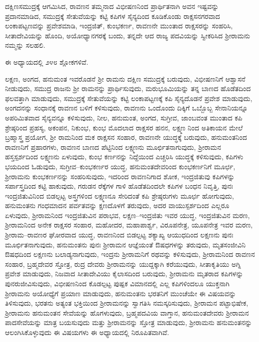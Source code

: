 ದಕ್ಷಿಣಸಮುದ್ರಕ್ಕೆ ಆಗಮಿಸಿದ, ರಾವಣನ ತಮ್ಮನಾದ ವಿಭೀಷಣನಿಂದ ಪ್ರಾರ್ಥಿತನಾಗಿ ಅವನ ಇಷ್ಟವನ್ನು ಪ್ರದಾನಮಾಡಿದ, ಸಮುದ್ರಕ್ಕೆ ಸೇತುವೆಯನ್ನು ಕಟ್ಟಿ ಕಪಿಗಳ ಸೈನ್ಯದಿಂದ ಕೂಡಿಕೊಂಡು ರಾಕ್ಷಸನಗರವಾದ ಲಂಕಾಪಟ್ಟಣವನ್ನು ಪ್ರವೇಶಮಾಡಿ, ಇಂದ್ರಜಿತ್, ಕುಂಭಕರ್ಣ, ರಾವಣನೇ ಮುಂತಾದ ರಾಕ್ಷಸರನ್ನು ಸಂಹರಿಸಿ, ಸೀತಾದೇವಿಯನ್ನು ಹೊಂದಿ, ಅಯೋಧ್ಯಾನಗರಕ್ಕೆ ಬಂದು, ತನ್ನದೇ ಆದ ರಾಜ್ಯ ಪದವಿಯನ್ನು ಸ್ವೀಕರಿಸಿದ ಶ‍್ರೀರಾಮನು ನಮ್ಮನ್ನು ಸಲಹಲಿ.

ಈ ಅಧ್ಯಾಯದಲ್ಲಿ ೨೪೮ ಶ್ಲೋಕಗಳಿವೆ.

ಲಕ್ಷಣ, ಅಂಗದ, ಹನುಮಂತ ಇವರೊಡನೆ ಶ‍್ರೀ ರಾಮನು ದಕ್ಷಿಣ ಸಮುದ್ರಕ್ಕೆ ಬರುವುದು, ವಿಭೀಷಣನಿಗೆ ಆಶ್ವಾಸನೆ ನೀಡುವುದು, ಸಮುದ್ರ ರಾಜನು ಶ‍್ರೀ ರಾಮನನ್ನು ಪ್ರಾರ್ಥಿಸುವುದು, ಮರುಭೂಮಿಯನ್ನು ತನ್ನ ಬಾಣದ ಹೊಡೆತದಿಂದ ಫಲವತ್ತಾಗಿ ಮಾಡುವುದು, ಸಮುದ್ರಕ್ಕೆ ಸೇತುವೆಯನ್ನು ಕಟ್ಟಿ ಲಂಕಾಪಟ್ಟಣಕ್ಕೆ ಕಪಿ ಸೈನ್ಯದೊಡನೆ ಪ್ರವೇಶ ಮಾಡುವುದು, ಅಂಗದನನ್ನು ಸಂಧಾನಕ್ಕೆ ರಾವಣನ ಬಳಿಗೆ ಕಳಿಸುವುದು, ರಾವಣನು ಒಂದೊಂದು ದಿಕ್ಕಿಗೆ ಒಬ್ಬೊಬ್ಬ ಸೇನಾನಿಯನ್ನೂ ಅಪರಿಮಿತವಾದ ಸೈನ್ಯವನ್ನೂ ಕಳಿಸುವುದು, ನೀಲ, ಹನುಮಂತ, ಅಂಗದ, ಸುಗ್ರೀವ, ಜಾಂಬವಂತ ಮುಂತಾದ ಕಪಿ ಶ್ರೇಷ್ಠರಿಂದ ಪ್ರಹಸ್ಯ, ಅಕಂಪನ, ನಿಕುಂಭ, ಕುಂಭ ಮೊದಲಾದ ರಾಕ್ಷಸರ ಹನನ, ಲಕ್ಷ್ಮಣ ನಿಂದ ಅತಿಕಾಯನ ಮೇಲೆ ಬ್ರಹ್ಮಾಸ್ತ್ರ ಪ್ರಯೋಗ, ಶ‍್ರೀ ರಾಮನಿಂದ ಮಕ ರಾಕ್ಷಸನ ಸಂಹಾರ, ರಾವಣನೇ ಯುದ್ಧಕ್ಕೆ ಬರುವುದು, ಹನುಮಂತನಿಂದ ರಾವಣನಿಗೆ ಪ್ರಹಾರಗಳು, ರಾವಣನ ಬಾಣದ ಪೆಟ್ಟಿನಿಂದ ಲಕ್ಷ್ಮಣನು ಮೂರ್ಛಿತನಾಗುವುದು, ಶ‍್ರೀರಾಮನ ಹಸ್ತಸ್ಪರ್ಶದಿಂದ ಲಕ್ಷ್ಮಣನು ಏಳುವುದು, ಕುಂಭ ಕರ್ಣನನ್ನು ನಿದ್ದೆಯಿಂದ ಎಚ್ಚರಿಸಿ ಯುದ್ಧಕ್ಕೆ ಕಳಿಸುವುದು, ಕಪಿಗಳು ಭಯದಿಂದ ಓಡುವುದು, ಸುಗ್ರೀವ–ಕುಂಭಕರ್ಣರ ಯುದ್ಧ, ಹನುಮಂತದೇವರಿಂದ ಕುಂಭಕರ್ಣನಿಗೆ ಮೂರ್ಛ, ಶ‍್ರೀರಾಮನು ಕುಂಭಕರ್ಣನನ್ನು ಸಂಹರಿಸುವುದು, ಇದರಿಂದ ರಾವಣನಿಗಾದ ಶೋಕ, ಇಂದ್ರಜಿತುವು ಕಪಿಗಳನ್ನು ಸರ್ಪಾಸ್ತ್ರದಿಂದ ಕಟ್ಟಿ ಹಾಕುವುದು, ಗರುಡನ ರೆಕ್ಕೆಗಳ ಗಾಳಿ ಹೊಡೆತದಿಂದಲೇ ಕಪಿಗಳ ಬಂಧನ ನಿವೃತ್ತಿ, ಪುನಃ ಇಂದ್ರಜಿತುವಿನಿಂದ ಬಿಡಲ್ಪಟ್ಟ ಅಸ್ತ್ರಗಳಿಂದ ಲಕ್ಷ್ಮಣನೂ ಸೇರಿದಂತೆ ಕಪಿ ಶ್ರೇಷ್ಠರುಗಳು ಮೂರ್ಛ ಹೋಗುವುದು, ಹನುಮಂತನು ಗಂಧಮಾದನ ಪರ್ವತವನ್ನು ಕ್ಷಣದೊಳಗೆ ತರುವುದು, ಅದರ ವಾಯುಸ್ಪರ್ಶದಿಂದ ಎಲ್ಲರೂ ಏಳುವುದು, ಶ‍್ರೀರಾಮನಿಂದ ಇಂದ್ರಜಿತುವಿನ ಪರಾಭವ, ಲಕ್ಷಣ–ಇಂದ್ರಜಿತು ಇವರ ಯುದ್ಧ, ಇಂದ್ರಜಿತುವಿನ ಮರಣ, ಶ‍್ರೀರಾಮನಿಂದ ಅನೇಕ ರಾಕ್ಷಸರ ಸಂಹಾರ, ಮಹೋದರ, ಮಹಾಪಾರ್ಶ್ವ, ವಿರೂಪನೇತ್ರ, ಯೂಪನೇತ್ರ ಇವರ ಮರಣ, ಶ‍್ರೀರಾಮ–ರಾವಣರ ಘೋರವಾದ ಯುದ್ಧ, ರಾವಣನಿಂದ ಬಿಡಲ್ಪಟ್ಟ ಶಕ್ಯಾಖ್ಯ ಆಯುಧದಿಂದ ಲಕ್ಷಣನು ಪುನಃ ಮೂರ್ಛಿತನಾಗುವುದು, ಹನುಮಂತನು ಪುನಃ ಶ‍್ರೀರಾಮನ ಆಜ್ಞೆಯಂತೆ ಔಷಧಗಳನ್ನು ತರುವುದು, ಮೃತಸಂಜೀವಿನಿ ಔಷಧದಿಂದ ಲಕ್ಷಣನು ಬಲಾಡ್ಯನಾಗುವುದು, ಇಂದ್ರನು ಶ‍್ರೀರಾಮನಿಗೆ ರಥವನ್ನು ಕಳಿಸುವುದು, ಶ‍್ರೀರಾಮನಿಂದ ರಾವಣನ ಸಂಹಾರ, ಬ್ರಹ್ಮದೇವರ ಸ್ತೋತ್ರ, ರುದ್ರ ದೇವರು ಶ‍್ರೀರಾಮನನ್ನು ಯುದ್ದಕ್ಕಾಗಿ ಕರೆಯುವುದು, ಸೀತಾಕೃತಿಯು ಅಗ್ನಿ ಪ್ರವೇಶ ಮಾಡುವುದು, ನಿಜವಾದ ಸೀತಾದೇವಿಯು ಕೈಲಾಸದಿಂದ ಬರುವುದು, ಶ‍್ರೀರಾಮನು ಮೃತರಾದ ಕಪಿಗಳನ್ನು ಪುನರುಜೀವಿಸುವುದು, ವಿಭೀಷಣನಿಂದ ಕೊಡಲ್ಪಟ್ಟ ಪುಷ್ಪಕ ವಿಮಾನದಲ್ಲಿ ಎಲ್ಲ ಕಪಿಗಳಿಂದಲೂ ಯುಕ್ತನಾಗಿ ಶ‍್ರೀರಾಮನು ಅಯೋಧ್ಯೆಗೆ ಪ್ರಯಾಣ ಮಾಡುವುದು, ಹನುಮಂತನು ಭರತನಿಗೆ ಮುಂಚೆಯೇ ಈ ವಿಷಯವನ್ನು ತಿಳಿಸುವುದು, ಭರತನು ಅತ್ಯಂತ ಭಕ್ತಿಯಿಂದ ಶ‍್ರೀರಾಮನನ್ನು ಸ್ವಾಗತಿಸಿ ನಮಸ್ಕರಿಸುವುದು, ಶ‍್ರೀರಾಮನ ಪಟ್ಟಾಭಿಷೇಕ, ಶ‍್ರೀರಾಮನು ಹನುಮಂತನ ಸೇವೆಯನ್ನು ಹೊಗಳುವುದು, ಬ್ರಹ್ಮಪದವಿಯ ವಾಗ್ತಾನ, ಹನುಮಂತದೇವರು ಶ‍್ರೀರಾಮನ ಪಾದಸೇವೆಯನ್ನು ಮಾತ್ರ ಬಯಸುವುದು ಮತ್ತು ಶ‍್ರೀರಾಮನನ್ನು ಸ್ತೋತ್ರ ಮಾಡುವುದು, ಶ‍್ರೀರಾಮನು ಹನುಮಂತನನ್ನು ಆಲಂಗಿಸಿಕೊಳ್ಳುವುದು ಈ ವಿಷಯಗಳು ಈ ಅಧ್ಯಾಯದಲ್ಲಿ ನಿರೂಪಿತವಾಗಿವೆ.


